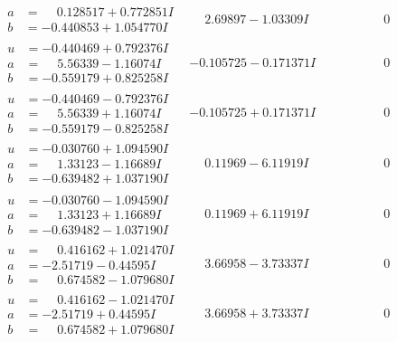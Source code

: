 \documentclass[1p]{elsarticle_modified}
\theoremstyle{definition}
\begin{document}
$$\begin{array}{c|c|c}
\begin{aligned}
a &= \phantom{-}0.128517 + 0.772851 I \\
b &= -0.440853 + 1.054770 I\end{aligned}
 & \phantom{-}2.69897 - 1.03309 I & \phantom{-0.000000 } 0 \\ \hline\begin{aligned}
u &= -0.440469 + 0.792376 I \\
a &= \phantom{-}5.56339 - 1.16074 I \\
b &= -0.559179 + 0.825258 I\end{aligned}
 & -0.105725 - 0.171371 I & \phantom{-0.000000 } 0 \\ \hline\begin{aligned}
u &= -0.440469 - 0.792376 I \\
a &= \phantom{-}5.56339 + 1.16074 I \\
b &= -0.559179 - 0.825258 I\end{aligned}
 & -0.105725 + 0.171371 I & \phantom{-0.000000 } 0 \\ \hline\begin{aligned}
u &= -0.030760 + 1.094590 I \\
a &= \phantom{-}1.33123 - 1.16689 I \\
b &= -0.639482 + 1.037190 I\end{aligned}
 & \phantom{-}0.11969 - 6.11919 I & \phantom{-0.000000 } 0 \\ \hline\begin{aligned}
u &= -0.030760 - 1.094590 I \\
a &= \phantom{-}1.33123 + 1.16689 I \\
b &= -0.639482 - 1.037190 I\end{aligned}
 & \phantom{-}0.11969 + 6.11919 I & \phantom{-0.000000 } 0 \\ \hline\begin{aligned}
u &= \phantom{-}0.416162 + 1.021470 I \\
a &= -2.51719 - 0.44595 I \\
b &= \phantom{-}0.674582 - 1.079680 I\end{aligned}
 & \phantom{-}3.66958 - 3.73337 I & \phantom{-0.000000 } 0 \\ \hline\begin{aligned}
u &= \phantom{-}0.416162 - 1.021470 I \\
a &= -2.51719 + 0.44595 I \\
b &= \phantom{-}0.674582 + 1.079680 I\end{aligned}
 & \phantom{-}3.66958 + 3.73337 I & \phantom{-0.000000 } 0\\

\end{array}$$
\end{document}
